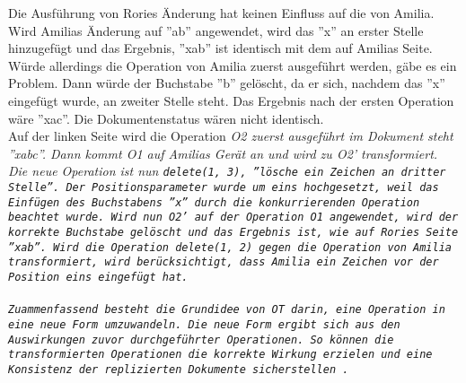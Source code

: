 Die Ausführung von Rories Änderung hat keinen Einfluss auf die von Amilia.
Wird Amilias Änderung auf ''ab'' angewendet, wird das ''x'' an erster Stelle hinzugefügt und das Ergebnis, ''xab'' ist identisch mit dem auf Amilias Seite.\\
%
Würde allerdings die Operation von Amilia zuerst ausgeführt werden, gäbe es ein Problem.
Dann würde der Buchstabe ''b'' gelöscht, da er sich, nachdem das ''x'' eingefügt wurde, an zweiter Stelle steht.
Das Ergebnis nach der ersten Operation wäre ''xac''. Die Dokumentenstatus wären nicht identisch.\\
%
Auf der linken Seite wird die Operation \it{O2} zuerst ausgeführt im Dokument steht ''xabc''.
Dann kommt \it{O1} auf Amilias Gerät an und wird zu \it{O2'} transformiert. Die neue Operation ist nun \tt{delete(1, 3)}, ''lösche ein Zeichen an dritter Stelle''. Der Positionsparameter wurde um eins hochgesetzt, weil das Einfügen des Buchstabens ''x'' durch die konkurrierenden Operation beachtet wurde.
Wird nun \it{O2'} auf der Operation \it{O1} angewendet, wird der korrekte Buchstabe gelöscht und das Ergebnis ist, wie auf Rories Seite ''xab''.
Wird die Operation \tt{delete(1, 2)} gegen die Operation von Amilia transformiert, wird berücksichtigt, dass Amilia ein Zeichen vor der Position eins eingefügt hat.\\\\
%
%
Zuammenfassend besteht die Grundidee von \gls{OT} darin, eine Operation in eine neue Form umzuwandeln.
Die neue Form ergibt sich aus den Auswirkungen zuvor durchgeführter Operationen.
So können die transformierten Operationen die korrekte Wirkung erzielen und eine Konsistenz der replizierten Dokumente sicherstellen~\cite{ot-later}.
%
%
